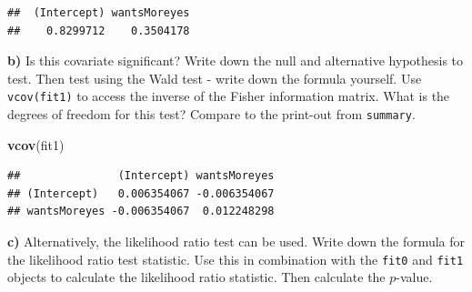 \documentclass[
]{article}
\newenvironment{Shaded}{\begin{snugshade}}{\end{snugshade}}
\newcommand{\FunctionTok}[1]{\textcolor[rgb]{0.13,0.29,0.53}{\textbf{#1}}}
\newcommand{\NormalTok}[1]{#1}
\begin{document}
\begin{verbatim}
##  (Intercept) wantsMoreyes 
##    0.8299712    0.3504178
\end{verbatim}

\textbf{b)} Is this covariate significant? Write down the null and
alternative hypothesis to test. Then test using the Wald test - write
down the formula yourself. Use \texttt{vcov(fit1)} to access the inverse
of the Fisher information matrix. What is the degrees of freedom for
this test? Compare to the print-out from \texttt{summary}.

\begin{Shaded}
\begin{Highlighting}[]
\FunctionTok{vcov}\NormalTok{(fit1)}
\end{Highlighting}
\end{Shaded}

\begin{verbatim}
##               (Intercept) wantsMoreyes
## (Intercept)   0.006354067 -0.006354067
## wantsMoreyes -0.006354067  0.012248298
\end{verbatim}

\textbf{c)} Alternatively, the likelihood ratio test can be used. Write
down the formula for the likelihood ratio test statistic. Use this in
combination with the \texttt{fit0} and \texttt{fit1} objects to
calculate the likelihood ratio statistic. Then calculate the
\(p\)-value.
\end{document}
